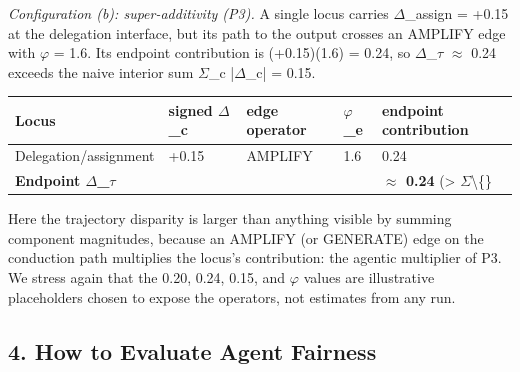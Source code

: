 \documentclass[10pt]{article}
\begin{document}
\emph{Configuration (b): super-additivity (P3).} A single locus carries $\Delta$\_assign = +0.15 at the delegation interface, but its path to the output crosses an AMPLIFY edge with $\varphi$ = 1.6. Its endpoint contribution is (+0.15)(1.6) = 0.24, so $\Delta$\_$\tau$ $\approx$ 0.24 exceeds the naive interior sum $\Sigma$\_c |$\Delta$\_c| = 0.15.

\begin{center}\footnotesize
\begin{longtable}{|p{}|p{}|p{}|p{}|p{}|}
\hline \textbf{Locus} & \textbf{signed $\Delta$\_c} & \textbf{edge operator} & \textbf{$\varphi$\_e} & \textbf{endpoint contribution} \\ \hline\endhead
Delegation/assignment & +0.15 & AMPLIFY & 1.6 & 0.24 \\ \hline
\textbf{Endpoint $\Delta$\_$\tau$} &  &  &  & \textbf{$\approx$ 0.24} (> $\Sigma$\textbackslash\{\} \\ \hline
\end{longtable}\end{center}

Here the trajectory disparity is larger than anything visible by summing component magnitudes, because an AMPLIFY (or GENERATE) edge on the conduction path multiplies the locus's contribution: the agentic multiplier of P3. We stress again that the 0.20, 0.24, 0.15, and $\varphi$ values are illustrative placeholders chosen to expose the operators, not estimates from any run.



\subsection*{4. How to Evaluate Agent Fairness}
\end{document}
